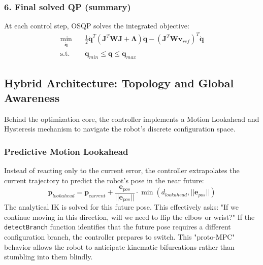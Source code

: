 \documentclass[12pt,a4paper]{report}
\begin{document}
\subsubsection{6. Final solved QP (summary)}
At each control step, OSQP solves the integrated objective:
\begin{align}
    \min_{\dot{\mathbf{q}}} \quad & \frac{1}{2} \dot{\mathbf{q}}^T (\mathbf{J}^T \mathbf{W} \mathbf{J} + \mathbf{\Lambda}) \dot{\mathbf{q}} - (\mathbf{J}^T \mathbf{W} \mathbf{v}_{ref})^T \dot{\mathbf{q}} \\
    \text{s.t.} \quad & \dot{\mathbf{q}}_{min} \leq \dot{\mathbf{q}} \leq \dot{\mathbf{q}}_{max}
\end{align}

\subsection{Hybrid Architecture: Topology and Global Awareness}
Behind the optimization core, the controller implements a Motion Lookahead and Hysteresis mechanism to navigate the robot's discrete configuration space.

\subsubsection{Predictive Motion Lookahead}
Instead of reacting only to the current error, the controller extrapolates the current trajectory to predict the robot's pose in the near future:
\begin{equation}
    \mathbf{p}_{lookahead} = \mathbf{p}_{current} + \frac{\mathbf{e}_{pos}}{||\mathbf{e}_{pos}||} \cdot \min(d_{lookahead}, ||\mathbf{e}_{pos}||)
\end{equation}
The analytical IK is solved for this future pose. This effectively asks: "If we continue moving in this direction, will we need to flip the elbow or wrist?" If the \texttt{detectBranch} function identifies that the future pose requires a different configuration branch, the controller prepares to switch. This "proto-MPC" behavior allows the robot to anticipate kinematic bifurcations rather than stumbling into them blindly.
\end{document}
